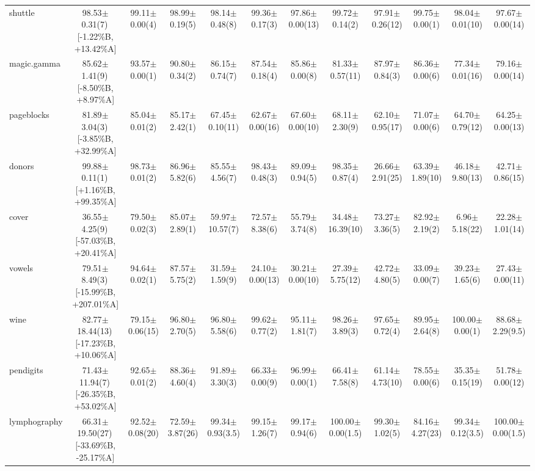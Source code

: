 \documentclass[conference]{IEEEtran}
\begin{document}
\begin{table}
{\begin{tabular}{lccccccccccc}
				shuttle & 98.53$\pm$0.31(7)\,[{-}1.22\%B, {+}13.42\%A] & 99.11$\pm$0.00(4) & 98.99$\pm$0.19(5) & 98.14$\pm$0.48(8) & 99.36$\pm$0.17(3) & 97.86$\pm$0.00(13) & 99.72$\pm$0.14(2) & 97.91$\pm$0.26(12) & 99.75$\pm$0.00(1) & 98.04$\pm$0.01(10) & 97.67$\pm$0.00(14) \\
				magic.gamma & 85.62$\pm$1.41(9)\,[{-}8.50\%B, {+}8.97\%A] & 93.57$\pm$0.00(1) & 90.80$\pm$0.34(2) & 86.15$\pm$0.74(7) & 87.54$\pm$0.18(4) & 85.86$\pm$0.00(8) & 81.33$\pm$0.57(11) & 87.97$\pm$0.84(3) & 86.36$\pm$0.00(6) & 77.34$\pm$0.01(16) & 79.16$\pm$0.00(14) \\
				pageblocks & 81.89$\pm$3.04(3)\,[{-}3.85\%B, {+}32.99\%A] & 85.04$\pm$0.01(2) & 85.17$\pm$2.42(1) & 67.45$\pm$0.10(11) & 62.67$\pm$0.00(16) & 67.60$\pm$0.00(10) & 68.11$\pm$2.30(9) & 62.10$\pm$0.95(17) & 71.07$\pm$0.00(6) & 64.70$\pm$0.79(12) & 64.25$\pm$0.00(13) \\
				donors & 99.88$\pm$0.11(1)\,[{+}1.16\%B, {+}99.35\%A] & 98.73$\pm$0.01(2) & 86.96$\pm$5.82(6) & 85.55$\pm$4.56(7) & 98.43$\pm$0.48(3) & 89.09$\pm$0.94(5) & 98.35$\pm$0.87(4) & 26.66$\pm$2.91(25) & 63.39$\pm$1.89(10) & 46.18$\pm$9.80(13) & 42.71$\pm$0.86(15) \\
				cover & 36.55$\pm$4.25(9)\,[{-}57.03\%B, {+}20.41\%A] & 79.50$\pm$0.02(3) & 85.07$\pm$2.89(1) & 59.97$\pm$10.57(7) & 72.57$\pm$8.38(6) & 55.79$\pm$3.74(8) & 34.48$\pm$16.39(10) & 73.27$\pm$3.36(5) & 82.92$\pm$2.19(2) & 6.96$\pm$5.18(22) & 22.28$\pm$1.01(14) \\
				vowels & 79.51$\pm$8.49(3)\,[{-}15.99\%B, {+}207.01\%A] & 94.64$\pm$0.02(1) & 87.57$\pm$5.75(2) & 31.59$\pm$1.59(9) & 24.10$\pm$0.00(13) & 30.21$\pm$0.00(10) & 27.39$\pm$5.75(12) & 42.72$\pm$4.80(5) & 33.09$\pm$0.00(7) & 39.23$\pm$1.65(6) & 27.43$\pm$0.00(11) \\
				wine & 82.77$\pm$18.44(13)\,[{-}17.23\%B, {+}10.06\%A] & 79.15$\pm$0.06(15) & 96.80$\pm$2.70(5) & 96.80$\pm$5.58(6) & 99.62$\pm$0.77(2) & 95.11$\pm$1.81(7) & 98.26$\pm$3.89(3) & 97.65$\pm$0.72(4) & 89.95$\pm$2.64(8) & 100.00$\pm$0.00(1) & 88.68$\pm$2.29(9.5) \\
				pendigits & 71.43$\pm$11.94(7)\,[{-}26.35\%B, {+}53.02\%A] & 92.65$\pm$0.01(2) & 88.36$\pm$4.60(4) & 91.89$\pm$3.30(3) & 66.33$\pm$0.00(9) & 96.99$\pm$0.00(1) & 66.41$\pm$7.58(8) & 61.14$\pm$4.73(10) & 78.55$\pm$0.00(6) & 35.35$\pm$0.15(19) & 51.78$\pm$0.00(12) \\
				lymphography & 66.31$\pm$19.50(27)\,[{-}33.69\%B, {-}25.17\%A] & 92.52$\pm$0.08(20) & 72.59$\pm$3.87(26) & 99.34$\pm$0.93(3.5) & 99.15$\pm$1.26(7) & 99.17$\pm$0.94(6) & 100.00$\pm$0.00(1.5) & 99.30$\pm$1.02(5) & 84.16$\pm$4.27(23) & 99.34$\pm$0.12(3.5) & 100.00$\pm$0.00(1.5) \\

\end{tabular}}
\end{table}
\end{document}

